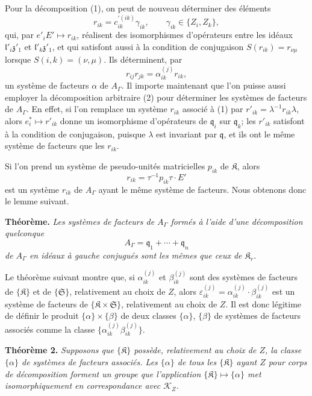 Pour la décomposition (1), on peut de nouveau déterminer des éléments
\[
r_{ik}=c_{ik}^{\prime(ik)}\gamma_{ik},\qquad \gamma_{ik}\in\{Z_i,Z_k\},
\]
qui, par \(e'_iE'\mapsto r_{ik}\), réalisent des isomorphismes d'opérateurs entre les idéaux \(\mathfrak l'_i\mathfrak z'_1\) et \(\mathfrak l'_k\mathfrak z'_1\), et qui satisfont aussi à la condition de conjugaison \(S(r_{ik})=r_{\nu\mu}\) lorsque \(S(i,k)=(\nu,\mu)\). Ils déterminent, par
\[
r_{ij}r_{jk}=\alpha_{ik}^{(j)}r_{ik},
\]
un système de facteurs \(\alpha\) de \(A_\Gamma\). Il importe maintenant que l'on puisse aussi employer la décomposition arbitraire (2) pour déterminer les systèmes de facteurs de \(A_\Gamma\). En effet, si l'on remplace un système \(r_{ik}\) associé à (1) par \(r'_{ik}=\lambda^{-1}r_{ik}\lambda\), alors \(e_i^*\mapsto r'_{ik}\) donne un isomorphisme d'opérateurs de \(\mathfrak q_i\) sur \(\mathfrak q_k\); les \(r'_{ik}\) satisfont à la condition de conjugaison, puisque \(\lambda\) est invariant par \(\mathfrak q\), et ils ont le même système de facteurs que les \(r_{ik}\).

Si l'on prend un système de pseudo-unités matricielles \(p_{ik}\) de \(\mathfrak K\), alors
\[
r_{ik}=\tau^{-1}p_{ik}\tau\cdot E'
\]
est un système \(r_{ik}\) de \(A_\Gamma\) ayant le même système de facteurs. Nous obtenons donc le lemme suivant.

\textbf{Théorème.} \emph{Les systèmes de facteurs de \(A_\Gamma\) formés à l'aide d'une décomposition quelconque}
\[
A_\Gamma=\mathfrak q_1+\cdots+\mathfrak q_n
\]
\emph{de \(A_\Gamma\) en idéaux à gauche conjugués sont les mêmes que ceux de \(\mathfrak K_r\).}

Le théorème suivant montre que, si \(\alpha_{ik}^{(j)}\) et \(\beta_{ik}^{(j)}\) sont des systèmes de facteurs de \(\{\mathfrak K\}\) et de \(\{\mathfrak S\}\), relativement au choix de \(Z\), alors \(\varepsilon_{ik}^{(j)}=\alpha_{ik}^{(j)}\cdot\beta_{ik}^{(j)}\) est un système de facteurs de \(\{\mathfrak K\times\mathfrak S\}\), relativement au choix de \(Z\). Il est donc légitime de définir le produit \(\{\alpha\}\times\{\beta\}\) de deux classes \(\{\alpha\}\), \(\{\beta\}\) de systèmes de facteurs associés comme la classe \(\{\alpha_{ik}^{(j)}\beta_{ik}^{(j)}\}\).

\textbf{Théorème 2.} \emph{Supposons que \(\{\mathfrak K\}\) possède, relativement au choix de \(Z\), la classe \(\{\alpha\}\) de systèmes de facteurs associés. Les \(\{\alpha\}\) de tous les \(\{\mathfrak K\}\) ayant \(Z\) pour corps de décomposition forment un groupe que l'application \(\{\mathfrak K\}\mapsto\{\alpha\}\) met isomorphiquement en correspondance avec \(\mathscr K_Z\).}

